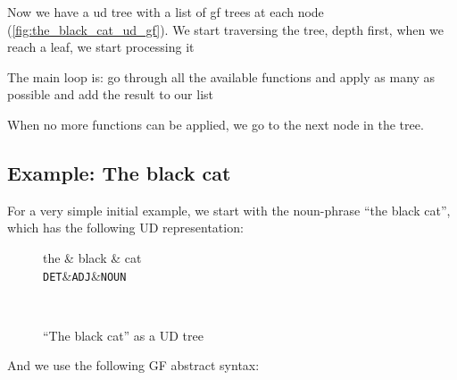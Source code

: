Now we have a ud tree with a list of gf trees at each node (\autoref{fig:the_black_cat_ud_gf}). We start traversing the tree, depth first, when we reach a leaf, we start processing it

The main loop is: go through all the available functions and apply as many as possible and add the result to our list

When no more functions can be applied, we go to the next node in the tree.

\subsection{Example: The black cat}

For a very simple initial example, we start with the noun-phrase ``the black cat'', which has the following UD representation:

\begin{figure}[H]
    \centering
    \setlength{\unitlength}{0.2mm}
    \begin{dependency}
        \begin{deptext}[column sep=0.4cm]
              the \& black \& cat \\
            {\tt DET}\&{\tt ADJ}\&{\tt NOUN}\\
        \end{deptext}
    \end{dependency} \\
    \caption{``The black cat'' as a UD tree}
    \label{fig:the_black_cat_ud}
\end{figure}

And we use the following GF abstract syntax:

